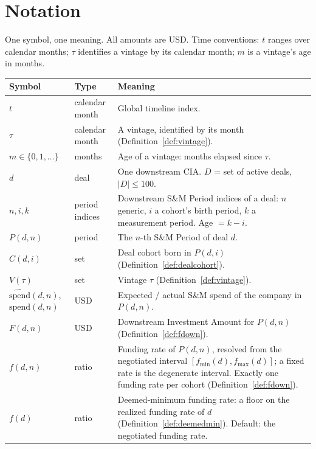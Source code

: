 \documentclass[11pt, a4paper]{article}
\theoremstyle{definition}
\newcommand{\spend}{\mathrm{spend}}               %
\newcommand{\espend}{\widehat{\mathrm{spend}}}    %
\begin{document}
\section{Notation}\label{sec:notation}

One symbol, one meaning. All amounts are USD. Time conventions: $t$ ranges over calendar months; $\tau$ identifies a vintage by its calendar month; $m$ is a vintage's age in months.

\begin{longtable}{@{} L{3.0cm} L{3.4cm} L{8.4cm} @{}}
\toprule
\textbf{Symbol} & \textbf{Type} & \textbf{Meaning} \\
\midrule
\endhead
$t$ & calendar month & Global timeline index. \\[3pt]
$\tau$ & calendar month & A vintage, identified by its month (Definition~\ref{def:vintage}). \\[3pt]
$m \in \{0, 1, \dots\}$ & months & Age of a vintage: months elapsed since $\tau$. \\[3pt]
$d$ & deal & One downstream CIA. $D$ = set of active deals, $|D| \leq 100$. \\[3pt]
$n, i, k$ & period indices & Downstream S\&M Period indices of a deal: $n$ generic, $i$ a cohort's birth period, $k$ a measurement period. Age $= k - i$. \\[3pt]
$P(d, n)$ & period & The $n$-th S\&M Period of deal $d$. \\[3pt]
$C(d, i)$ & set & Deal cohort born in $P(d, i)$ (Definition~\ref{def:dealcohort}). \\[3pt]
$V(\tau)$ & set & Vintage $\tau$ (Definition~\ref{def:vintage}). \\[3pt]
$\espend(d, n)$, $\spend(d, n)$ & USD & Expected / actual S\&M spend of the company in $P(d,n)$. \\[3pt]
$F(d, n)$ & USD & Downstream Investment Amount for $P(d, n)$ (Definition~\ref{def:fdown}). \\[3pt]
$f(d, n)$ & ratio & Funding rate of $P(d,n)$, resolved from the negotiated interval $[f_{\min}(d), f_{\max}(d)]$; a fixed rate is the degenerate interval. Exactly one funding rate per cohort (Definition~\ref{def:fdown}). \\[3pt]
$\underline{f}(d)$ & ratio & Deemed-minimum funding rate: a floor on the realized funding rate of $d$ (Definition~\ref{def:deemedmin}). Default: the negotiated funding rate. \\[3pt]

\end{longtable}
\end{document}
